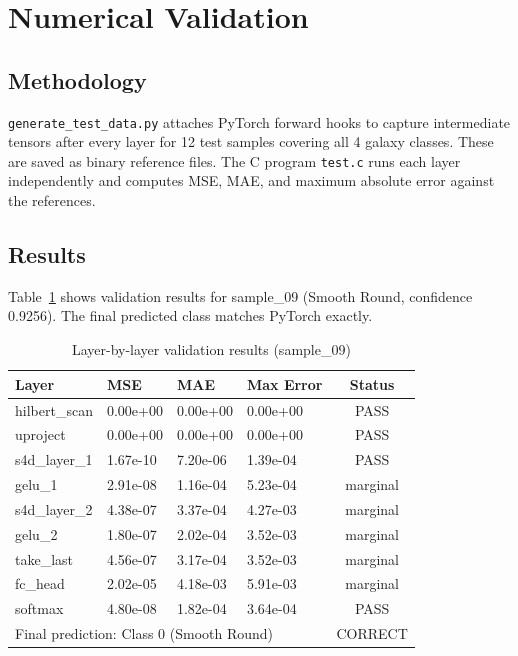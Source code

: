 \documentclass[conference]{IEEEtran}
\begin{document}
\section{Numerical Validation}

\subsection{Methodology}
\texttt{generate\_test\_data.py} attaches PyTorch forward hooks to capture
intermediate tensors after every layer for 12 test samples covering all 4
galaxy classes. These are saved as binary reference files. The C program
\texttt{test.c} runs each layer independently and computes MSE, MAE, and
maximum absolute error against the references.

\subsection{Results}
Table~\ref{tab:val} shows validation results for sample\_09 (Smooth Round,
confidence 0.9256). The final predicted class matches PyTorch exactly.

\begin{table}[h]
\centering
\caption{Layer-by-layer validation results (sample\_09)}
\label{tab:val}
\begin{tabular}{@{}llllc@{}}
\toprule
Layer & MSE & MAE & Max Error & Status \\
\midrule
hilbert\_scan  & 0.00e+00 & 0.00e+00 & 0.00e+00 & PASS \\
uproject       & 0.00e+00 & 0.00e+00 & 0.00e+00 & PASS \\
s4d\_layer\_1  & 1.67e-10 & 7.20e-06 & 1.39e-04 & PASS \\
gelu\_1        & 2.91e-08 & 1.16e-04 & 5.23e-04 & marginal \\
s4d\_layer\_2  & 4.38e-07 & 3.37e-04 & 4.27e-03 & marginal \\
gelu\_2        & 1.80e-07 & 2.02e-04 & 3.52e-03 & marginal \\
take\_last     & 4.56e-07 & 3.17e-04 & 3.52e-03 & marginal \\
fc\_head       & 2.02e-05 & 4.18e-03 & 5.91e-03 & marginal \\
softmax        & 4.80e-08 & 1.82e-04 & 3.64e-04 & PASS \\
\midrule
\multicolumn{4}{l}{Final prediction: Class 0 (Smooth Round)} & CORRECT \\
\bottomrule
\end{tabular}
\end{table}
\end{document}
